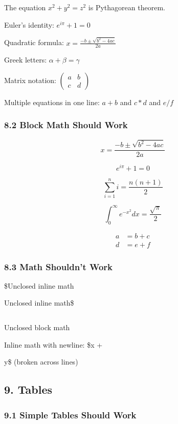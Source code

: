 \documentclass{article}
\begin{document}
The equation $x^2 + y^2 = z^2$ is Pythagorean theorem.

Euler's identity: $e^{i\pi} + 1 = 0$

Quadratic formula: $x = \frac{-b \pm \sqrt{b^2 - 4ac}}{2a}$

Greek letters: $\alpha + \beta = \gamma$

Matrix notation: $\begin{pmatrix} a & b \\ c & d \end{pmatrix}$

Multiple equations in one line: $a + b$ and $c * d$ and $e / f$

\subsubsection{ 8.2 Block Math Should Work}

\[
x = \frac{-b \pm \sqrt{b^2 - 4ac}}{2a}
\]

\[
e^{i\pi} + 1 = 0
\]

\[
\sum_{i=1}^{n} i = \frac{n(n+1)}{2}
\]

\[
\int_{0}^{\infty} e^{-x^2} dx = \frac{\sqrt{\pi}}{2}
\]

\[
\begin{align}
a &= b + c \\
d &= e + f
\end{align}
\]

\subsubsection{ 8.3 Math Shouldn't Work}

\$Unclosed inline math

Unclosed inline math\$

\[

\]

Unclosed block math

Inline math with newline: \$x +

y\$ (broken across lines)

\noindent\hrulefill

\subsection{ 9. Tables}

\subsubsection{ 9.1 Simple Tables Should Work}
\end{document}
